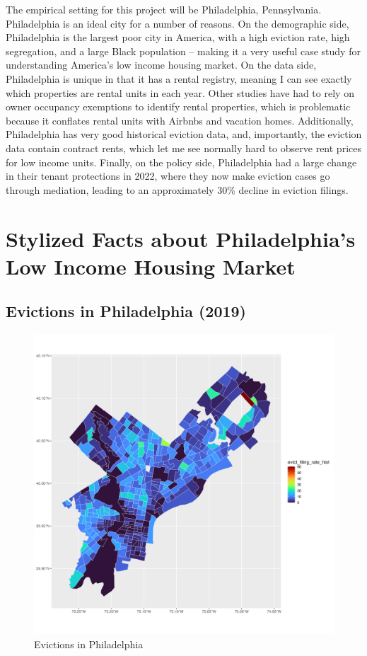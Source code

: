 \documentclass{article}
\begin{document}
The empirical setting for this project will be Philadelphia, Pennsylvania. Philadelphia is an ideal city for a number of reasons. On the demographic side, Philadelphia is the largest poor city in America, with a high eviction rate, high segregation, and a large Black population -- making it a very useful case study for understanding America's low income housing market. On the data side, Philadelphia is unique in that it has a rental registry, meaning I can see exactly which properties are rental units in each year. Other studies have had to rely on owner occupancy exemptions to identify rental properties, which is problematic because it conflates rental units with Airbnbs and vacation homes. Additionally, Philadelphia has very good historical eviction data, and, importantly, the eviction data contain contract rents, which let me see normally hard to observe rent prices for low income units. Finally, on the policy side, Philadelphia had a large change in their tenant protections in 2022, where they now make eviction cases go through mediation, leading to an approximately 30\% decline in eviction filings.

\section{Stylized Facts about Philadelphia's Low Income Housing Market}


\subsection{Evictions in Philadelphia (2019)}

\begin{figure}[htbp]
    \centering
    \includegraphics[width=0.6\linewidth]{figs/evict_filing_rate_hist.png}
    \caption{Evictions in Philadelphia}
    \label{fig:philly-map}
\end{figure}
\end{document}
